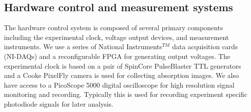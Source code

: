 \subsection{Hardware control and measurement systems} \label{ssec:comp_sys}
The hardware control system is composed of several primary components including the experimental clock, voltage output devices, and measurement instruments.
We use a series of National Instruments$^{TM}$ data acquisition cards (NI-DAQs) and a reconfigurable FPGA for generating output voltages.
The experimental clock is based on a pair of SpinCore PulseBlaster TTL generators and a Cooke PixelFly camera is used for collecting absorption images.
We also have access to a PicoScope 5000 digital oscilloscope for high resolution signal monitoring and recording. Typically this is used for recording experiment specific photodiode signals for later analysis.

